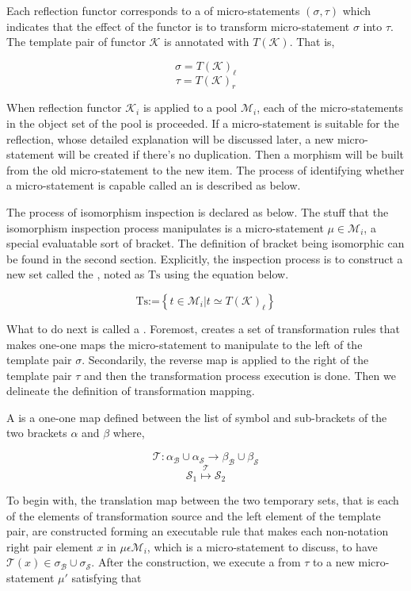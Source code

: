 \documentclass{article}
\begin{document}
Each reflection functor corresponds to a  of micro-statements \((\sigma ,\tau )\) which indicates that the effect of the functor is to transform micro-statement \(\sigma\) into $\tau $. The template pair of functor \(\mathcal{K}\) is annotated with \(T(\mathcal{K})\). That
is,

\[\sigma =T(\mathcal{K})_{\ell }\]
\[\tau =T(\mathcal{K})_{\mathit{r}}\]

When reflection functor \(\mathcal{K}_i\) is applied to a pool \(\mathcal{M}_i\), each of the micro-statements in the object set of the pool is proceeded. If a micro-statement is suitable for the reflection, whose detailed explanation will be discussed later, a new micro-statement will be created if there{'}s no duplication. Then a morphism will be built from the old micro-statement to the new item. The process of identifying whether a micro-statement is capable called an  is described as below.

 The process of isomorphism inspection is declared as below. The stuff that the isomorphism inspection process manipulates is a micro-statement \(\mu \in \mathcal{M}_i\), a special evaluatable sort of bracket. The definition of bracket being isomorphic can be found in the second section. Explicitly, the inspection process is to construct a new set called the , noted as \(\text{Ts}\) using the equation below.

\[\text{Ts}\text{:=}\left\{t\in \mathcal{M}_i|t\simeq T(\mathcal{K})_{\ell }\right\}\]

What to do next is called a . Foremost, creates a set of transformation rules that makes one-one maps the micro-statement to manipulate to the left of the template pair \(\sigma\). Secondarily, the reverse map is applied to the right of the template pair \(\tau\) and then the transformation process execution is done. Then we delineate the definition of { }transformation mapping.

 A  is a one-one map defined between the list of symbol and sub-brackets of the two brackets \(\alpha\) and \(\beta\) where,

\[\mathcal{T}:\alpha _{\mathcal{B}}\cup \alpha _{\mathcal{S}}\to \beta _{\mathcal{B}}\cup \beta _{\mathcal{S}}\]
\[\mathcal{S}_1\overset{\mathcal{T}}{\mapsto }\mathcal{S}_2\]

To begin with, the translation map between the two temporary sets, that is each of the elements of transformation source and the left element of the template pair, are constructed forming an executable rule that makes each non-notation right pair element \(x\) in \(\mu \epsilon \mathcal{M}_i\), which is a micro-statement to discuss, to have \(\mathcal{T}(x)\in \sigma _{\mathcal{B}}\cup \sigma _{\mathcal{S}}\). After the construction, we execute a  from \(\tau\) to a new micro-statement \(\mu '\) satisfying that
\end{document}
